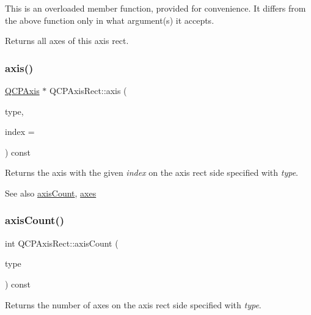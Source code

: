 This is an overloaded member function, provided for convenience. It differs from the above function only in what argument(s) it accepts.

Returns all axes of this axis rect. \mbox{\label{class_q_c_p_axis_rect_a583ae4f6d78b601b732183f6cabecbe1}} 
\subsubsection{\texorpdfstring{axis()}{axis()}}
{\footnotesize\ttfamily \hyperlink{class_q_c_p_axis}{Q\+C\+P\+Axis} $\ast$ Q\+C\+P\+Axis\+Rect\+::axis (\begin{DoxyParamCaption}\item[{\hyperlink{class_q_c_p_axis_ae2bcc1728b382f10f064612b368bc18a}{Q\+C\+P\+Axis\+::\+Axis\+Type}}]{type,  }\item[{int}]{index = {} }\end{DoxyParamCaption}) const}

Returns the axis with the given {\itshape index} on the axis rect side specified with {\itshape type}.

\begin{DoxySeeAlso}{See also}
\hyperlink{class_q_c_p_axis_rect_a85b321acec0f694d8b5fdeafdbff3133}{axis\+Count}, \hyperlink{class_q_c_p_axis_rect_a8db4722cb93e9c4a6f0d91150c200867}{axes} 
\end{DoxySeeAlso}
\mbox{\label{class_q_c_p_axis_rect_a85b321acec0f694d8b5fdeafdbff3133}} 
\subsubsection{\texorpdfstring{axis\+Count()}{axisCount()}}
{\footnotesize\ttfamily int Q\+C\+P\+Axis\+Rect\+::axis\+Count (\begin{DoxyParamCaption}\item[{\hyperlink{class_q_c_p_axis_ae2bcc1728b382f10f064612b368bc18a}{Q\+C\+P\+Axis\+::\+Axis\+Type}}]{type }\end{DoxyParamCaption}) const}

Returns the number of axes on the axis rect side specified with {\itshape type}.

